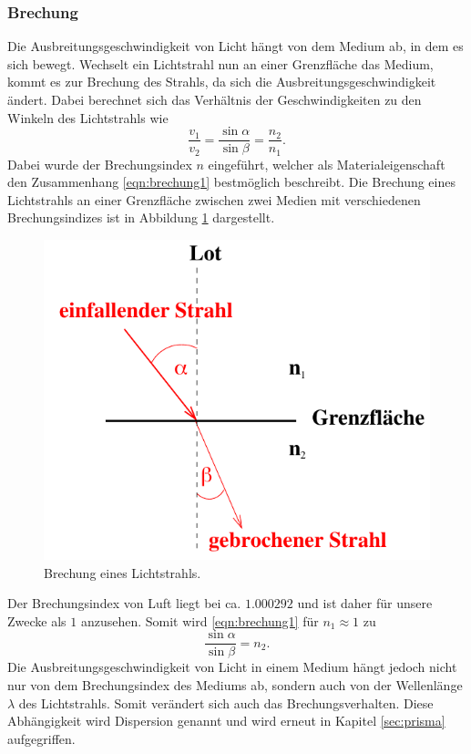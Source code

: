 \subsubsection*{Brechung}
\label{sec:brechung}
Die Ausbreitungsgeschwindigkeit von Licht hängt von dem Medium ab, in dem es sich bewegt. Wechselt ein Lichtstrahl
nun an einer Grenzfläche das Medium, kommt es zur Brechung des Strahls, da sich die Ausbreitungsgeschwindigkeit
ändert. Dabei berechnet sich das Verhältnis der Geschwindigkeiten zu den Winkeln des Lichtstrahls wie
\begin{equation}
    \frac{v_1}{v_2}=\frac{\sin\alpha}{\sin\beta}=\frac{n_2}{n_1}.
    \label{eqn:brechung1}
\end{equation}
Dabei wurde der Brechungsindex $n$ eingeführt, welcher als Materialeigenschaft den Zusammenhang \ref{eqn:brechung1}
bestmöglich beschreibt. Die Brechung eines Lichtstrahls an einer Grenzfläche zwischen zwei Medien mit verschiedenen
Brechungsindizes ist in Abbildung \ref{fig:brechung} dargestellt.
\begin{figure}[H]
    \centering
    \includegraphics[scale = 0.5]{pictures/Brechung.png}
    \caption{Brechung eines Lichtstrahls. \cite{AP01}}
    \label{fig:brechung}
\end{figure}
\noindent
Der Brechungsindex von Luft liegt bei ca. $\num{1.000292}$ \cite{AP01} und ist daher für unsere Zwecke als $1$
anzusehen. Somit wird \eqref{eqn:brechung1} für $n_1\approx1$ zu
\begin{equation}
    \frac{\sin\alpha}{\sin\beta}=n_2.
    \label{eqn:brechung2}
\end{equation}
Die Ausbreitungsgeschwindigkeit von Licht in einem Medium hängt jedoch nicht nur von dem Brechungsindex des Mediums
ab, sondern auch von der Wellenlänge $\lambda$ des Lichtstrahls. Somit verändert sich auch das Brechungsverhalten.
Diese Abhängigkeit wird Dispersion genannt und wird erneut in Kapitel \ref{sec:prisma} aufgegriffen.

